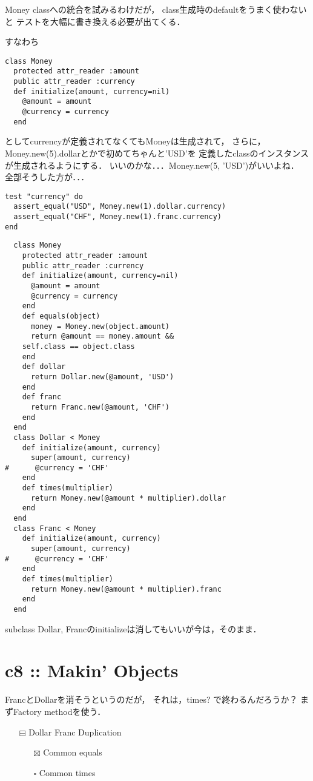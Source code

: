 \documentclass[11pt]{article}
\begin{document}
Money classへの統合を試みるわけだが，
class生成時のdefaultをうまく使わないと
テストを大幅に書き換える必要が出てくる．

すなわち
\begin{verbatim}
class Money
  protected attr_reader :amount
  public attr_reader :currency
  def initialize(amount, currency=nil)
    @amount = amount
    @currency = currency
  end
\end{verbatim}
としてcurrencyが定義されてなくてもMoneyは生成されて，
さらに，Money.new(5).dollarとかで初めてちゃんと'USD'を
定義したclassのインスタンスが生成されるようにする．
いいのかな．．．Money.new(5, 'USD')がいいよね．
全部そうした方が．．．

\begin{verbatim}
test "currency" do
  assert_equal("USD", Money.new(1).dollar.currency)
  assert_equal("CHF", Money.new(1).franc.currency)
end
\end{verbatim}

\begin{verbatim}
  class Money
    protected attr_reader :amount
    public attr_reader :currency
    def initialize(amount, currency=nil)
      @amount = amount
      @currency = currency
    end
    def equals(object)
      money = Money.new(object.amount)
      return @amount == money.amount &&
	self.class == object.class
    end
    def dollar
      return Dollar.new(@amount, 'USD')
    end
    def franc
      return Franc.new(@amount, 'CHF')
    end
  end
  class Dollar < Money
    def initialize(amount, currency)
      super(amount, currency)
#      @currency = 'CHF'
    end
    def times(multiplier)
      return Money.new(@amount * multiplier).dollar
    end
  end
  class Franc < Money
    def initialize(amount, currency)
      super(amount, currency)
#      @currency = 'CHF'
    end
    def times(multiplier)
      return Money.new(@amount * multiplier).franc
    end
  end
\end{verbatim}
subclass Dollar, Francのinitializeは消してもいいが今は，そのまま．

\section{c8 :: Makin' Objects}
\label{sec:org4a593d9}
FrancとDollarを消そうというのだが，
それは，times? で終わるんだろうか？
まずFactory methodを使う．
\begin{itemize}
\item[{$\boxminus$}] Dollar Franc Duplication
\begin{itemize}
\item[{$\boxtimes$}] Common equals
\item[{$\square$}] Common times
\end{itemize}
\end{itemize}
\end{document}

